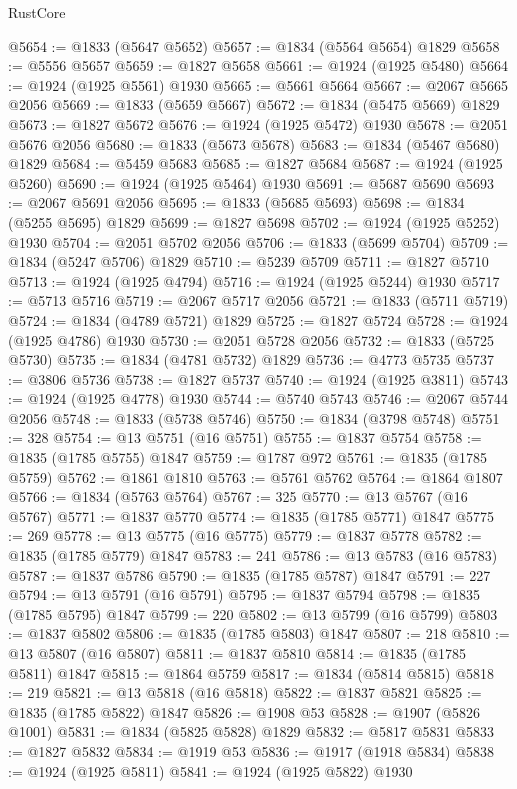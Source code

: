 \begin{lexlean}{RustCore}
\begin{coremodule}
@5654 := @1833 (@5647 @5652)
@5657 := @1834 (@5564 @5654) @1829
@5658 := @5556 @5657
@5659 := @1827 @5658
@5661 := @1924 (@1925 @5480)
@5664 := @1924 (@1925 @5561) @1930
@5665 := @5661 @5664
@5667 := @2067 @5665 @2056
@5669 := @1833 (@5659 @5667)
@5672 := @1834 (@5475 @5669) @1829
@5673 := @1827 @5672
@5676 := @1924 (@1925 @5472) @1930
@5678 := @2051 @5676 @2056
@5680 := @1833 (@5673 @5678)
@5683 := @1834 (@5467 @5680) @1829
@5684 := @5459 @5683
@5685 := @1827 @5684
@5687 := @1924 (@1925 @5260)
@5690 := @1924 (@1925 @5464) @1930
@5691 := @5687 @5690
@5693 := @2067 @5691 @2056
@5695 := @1833 (@5685 @5693)
@5698 := @1834 (@5255 @5695) @1829
@5699 := @1827 @5698
@5702 := @1924 (@1925 @5252) @1930
@5704 := @2051 @5702 @2056
@5706 := @1833 (@5699 @5704)
@5709 := @1834 (@5247 @5706) @1829
@5710 := @5239 @5709
@5711 := @1827 @5710
@5713 := @1924 (@1925 @4794)
@5716 := @1924 (@1925 @5244) @1930
@5717 := @5713 @5716
@5719 := @2067 @5717 @2056
@5721 := @1833 (@5711 @5719)
@5724 := @1834 (@4789 @5721) @1829
@5725 := @1827 @5724
@5728 := @1924 (@1925 @4786) @1930
@5730 := @2051 @5728 @2056
@5732 := @1833 (@5725 @5730)
@5735 := @1834 (@4781 @5732) @1829
@5736 := @4773 @5735
@5737 := @3806 @5736
@5738 := @1827 @5737
@5740 := @1924 (@1925 @3811)
@5743 := @1924 (@1925 @4778) @1930
@5744 := @5740 @5743
@5746 := @2067 @5744 @2056
@5748 := @1833 (@5738 @5746)
@5750 := @1834 (@3798 @5748)
@5751 := 328
@5754 := @13 @5751 (@16 @5751)
@5755 := @1837 @5754
@5758 := @1835 (@1785 @5755) @1847
@5759 := @1787 @972
@5761 := @1835 (@1785 @5759)
@5762 := @1861 @1810
@5763 := @5761 @5762
@5764 := @1864 @1807
@5766 := @1834 (@5763 @5764)
@5767 := 325
@5770 := @13 @5767 (@16 @5767)
@5771 := @1837 @5770
@5774 := @1835 (@1785 @5771) @1847
@5775 := 269
@5778 := @13 @5775 (@16 @5775)
@5779 := @1837 @5778
@5782 := @1835 (@1785 @5779) @1847
@5783 := 241
@5786 := @13 @5783 (@16 @5783)
@5787 := @1837 @5786
@5790 := @1835 (@1785 @5787) @1847
@5791 := 227
@5794 := @13 @5791 (@16 @5791)
@5795 := @1837 @5794
@5798 := @1835 (@1785 @5795) @1847
@5799 := 220
@5802 := @13 @5799 (@16 @5799)
@5803 := @1837 @5802
@5806 := @1835 (@1785 @5803) @1847
@5807 := 218
@5810 := @13 @5807 (@16 @5807)
@5811 := @1837 @5810
@5814 := @1835 (@1785 @5811) @1847
@5815 := @1864 @5759
@5817 := @1834 (@5814 @5815)
@5818 := 219
@5821 := @13 @5818 (@16 @5818)
@5822 := @1837 @5821
@5825 := @1835 (@1785 @5822) @1847
@5826 := @1908 @53
@5828 := @1907 (@5826 @1001)
@5831 := @1834 (@5825 @5828) @1829
@5832 := @5817 @5831
@5833 := @1827 @5832
@5834 := @1919 @53
@5836 := @1917 (@1918 @5834)
@5838 := @1924 (@1925 @5811)
@5841 := @1924 (@1925 @5822) @1930

\end{coremodule}
\end{lexlean}
